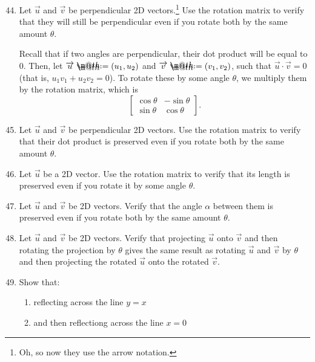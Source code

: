 \documentclass{article}
\makeatletter
\newcommand*{\defeq}{\mathrel{\rlap{%
                     \raisebox{0.3ex}{$\m@th\cdot$}}%
                     \raisebox{-0.3ex}{$\m@th\cdot$}}%
                     =}
\makeatother
\begin{document}
\begin{enumerate}
    \setcounter{enumi}{43}
    \item Let \(\overrightarrow{u}\) and \(\overrightarrow{v}\) be perpendicular 2D vectors.\footnote{Oh, so now they use the arrow notation.} Use the rotation matrix to verify that they will still be perpendicular even if you rotate both 
    by the same amount \(\theta\).\begin{solution}
        Recall that if two angles are perpendicular, their dot product will be equal to 0. Then, let \(\overrightarrow{u} \defeq (u_1,u_2)\) and \(\overrightarrow{v} \defeq (v_1,v_2)\), such that \(\overrightarrow{u} \cdot \overrightarrow{v} = 0\) (that is, 
        \(u_1 v_1 + u_2 v_2 = 0\)). To rotate these by some angle \(\theta\), we multiply them by the rotation matrix, which is\[
            \begin{bmatrix}
                \cos\theta & -\sin\theta \\ \sin\theta & \cos\theta
            \end{bmatrix}.
        \]
    \end{solution}
    \item Let \(\overrightarrow{u}\) and \(\overrightarrow{v}\) be perpendicular 2D vectors. Use the rotation matrix to verify that their dot product is preserved even if you rotate both 
    by the same amount \(\theta\). 
    \item Let \(\overrightarrow{u}\) be a 2D vector. Use the rotation matrix to verify that its length is preserved even if you rotate it by some angle \(\theta\). 
    \item Let \(\overrightarrow{u}\) and \(\overrightarrow{v}\) be 2D vectors. Verify that the angle \(\alpha\) between them is preserved even if you rotate both by the same amount \(\theta\). 
    \item Let \(\overrightarrow{u}\) and \(\overrightarrow{v}\) be 2D vectors. Verify that projecting \(\overrightarrow{u}\) onto \(\overrightarrow{v}\) and then rotating the projection by \(\theta\) gives
    the same result as rotating \(\overrightarrow{u}\) and \(\overrightarrow{v}\) by \(\theta\) and then projecting the rotated \(\overrightarrow{u}\) onto the rotated \(\overrightarrow{v}\). 
    \item Show that:\begin{enumerate}
        \item reflecting across the line \(y = x\)
        \item and then reflectiong across the line \(x=0\)

\end{enumerate}
\end{enumerate}
\end{document}
